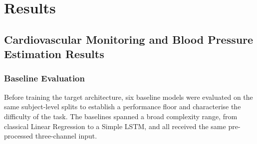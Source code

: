 





\section {Results}

\subsection{Cardiovascular Monitoring and Blood Pressure Estimation Results}

\subsubsection{Baseline Evaluation}
\label{subsubsec:bp_baselines}

\noindent Before training the target architecture, six baseline models were evaluated on the same
subject-level splits to establish a performance floor and characterise the difficulty of the
task.
The baselines spanned a broad complexity range, from classical Linear Regression to a Simple
LSTM, and all received the same pre-processed three-channel input.

